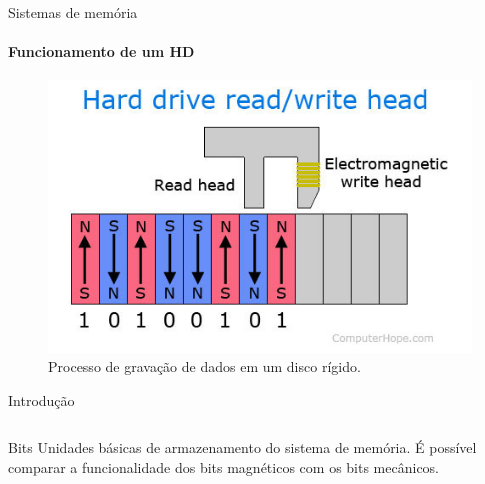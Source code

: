 \begin{frame}[t]{Sistemas de memória}
    \transboxout[duration=0.5]
    \framesubtitle{Funcionamento de um HD}    %

    \begin{figure}[H]
        \centering
        \includegraphics[scale = 0.40]{source/pictures/magnetic-media.jpg}
        \caption{Processo de gravação de dados em um disco rígido\cite{hdd-image}.}
        \label{fig:device}
    \end{figure}
\end{frame}

\begin{frame}[t]{Introdução}
    \transboxout[duration=0.5]
    \begin{columns}
    \end{columns}

    \begin{block}{Bits}
        Unidades básicas de armazenamento do sistema de memória. É possível comparar a funcionalidade dos bits magnéticos com os bits mecânicos.
    \end{block}
\end{frame}
